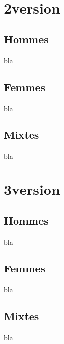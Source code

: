 \section{2\ieme version}
\subsection{Hommes}
\paragraph{}
bla

\subsection{Femmes}
\paragraph{}
bla

\subsection{Mixtes}
\paragraph{}
bla

\section{3\ieme version}
\subsection{Hommes}
\paragraph{}
bla

\subsection{Femmes}
\paragraph{}
bla

\subsection{Mixtes}
\paragraph{}
bla

